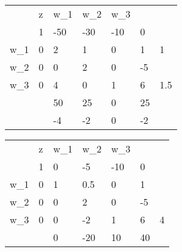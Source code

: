 \begin{tabular}{lllllll}
                       & z                      & w_1                      & w_2                      & w_3                      &                         &     \\
                       & 1                      & -50                    & -30                    & -10                    & 0                       &     \\ \cline{2-6}
\multicolumn{1}{l|}{w_1} &
  \multicolumn{1}{l|}{0} &
  \multicolumn{1}{l|}{\cellcolor[HTML]{FE0000}2} &
  \multicolumn{1}{l|}{1} &
  \multicolumn{1}{l|}{0} &
  \multicolumn{1}{l|}{1} &
  1 \\ \cline{2-6}
\multicolumn{1}{l|}{w_2} & \multicolumn{1}{l|}{0} & \multicolumn{1}{l|}{0} & \multicolumn{1}{l|}{2} & \multicolumn{1}{l|}{0} & \multicolumn{1}{l|}{-5} &     \\ \cline{2-6}
\multicolumn{1}{l|}{w_3} & \multicolumn{1}{l|}{0} & \multicolumn{1}{l|}{4} & \multicolumn{1}{l|}{0} & \multicolumn{1}{l|}{1} & \multicolumn{1}{l|}{6}  & 1.5 \\ \cline{2-6}
                       &                        & 50                     & 25                     & 0                      & 25                      &     \\
                       &                        & -4                     & -2                     & 0                      & -2                      &    
\end{tabular}

\begin{tabular}{lllllll}
                       & z                      & w_1                      & w_2                       & w_3                      &                         &  \\
                       & 1                      & 0                      & -5                       & -10                    & 0                       &  \\ \cline{2-6}
\multicolumn{1}{l|}{w_1} & \multicolumn{1}{l|}{0} & \multicolumn{1}{l|}{1} & \multicolumn{1}{l|}{0.5} & \multicolumn{1}{l|}{0} & \multicolumn{1}{l|}{1}  &  \\ \cline{2-6}
\multicolumn{1}{l|}{w_2} & \multicolumn{1}{l|}{0} & \multicolumn{1}{l|}{0} & \multicolumn{1}{l|}{2}   & \multicolumn{1}{l|}{0} & \multicolumn{1}{l|}{-5} &  \\ \cline{2-6}
\multicolumn{1}{l|}{w_3} &
  \multicolumn{1}{l|}{0} &
  \multicolumn{1}{l|}{0} &
  \multicolumn{1}{l|}{-2} &
  \multicolumn{1}{l|}{\cellcolor[HTML]{FE0000}1} &
  \multicolumn{1}{l|}{6} &
  4 \\ \cline{2-6}
                       &                        & 0                      & -20                      & 10                     & 40                      & 
\end{tabular}

